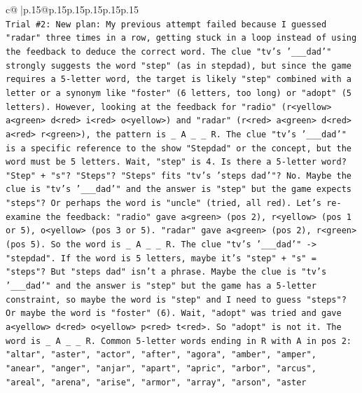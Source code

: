 \documentclass{article}
\begin{document}
{\begin{supertabular}{c@{$\;$}|p{.15\linewidth}@{}p{.15\linewidth}p{.15\linewidth}p{.15\linewidth}p{.15\linewidth}p{.15\linewidth}}
{{{\\ 
\texttt{Trial \#2: New plan: My previous attempt failed because I guessed "radar" three times in a row, getting stuck in a loop instead of using the feedback to deduce the correct word. The clue "tv's '\_\_\_dad'" strongly suggests the word "step" (as in stepdad), but since the game requires a 5{-}letter word, the target is likely "step" combined with a letter or a synonym like "foster" (6 letters, too long) or "adopt" (5 letters). However, looking at the feedback for "radio" (r<yellow> a<green> d<red> i<red> o<yellow>) and "radar" (r<red> a<green> d<red> a<red> r<green>), the pattern is \_ A \_ \_ R. The clue "tv's '\_\_\_dad'" is a specific reference to the show "Stepdad" or the concept, but the word must be 5 letters. Wait, "step" is 4. Is there a 5{-}letter word? "Step" + "s"? "Steps"? "Steps" fits "tv's 'steps dad'"? No. Maybe the clue is "tv's '\_\_\_dad'" and the answer is "step" but the game expects "steps"? Or perhaps the word is "uncle" (tried, all red). Let's re{-}examine the feedback: "radio" gave a<green> (pos 2), r<yellow> (pos 1 or 5), o<yellow> (pos 3 or 5). "radar" gave a<green> (pos 2), r<green> (pos 5). So the word is \_ A \_ \_ R. The clue "tv's '\_\_\_dad'" {-}> "stepdad". If the word is 5 letters, maybe it's "step" + "s" = "steps"? But "steps dad" isn't a phrase. Maybe the clue is "tv's '\_\_\_dad'" and the answer is "step" but the game has a 5{-}letter constraint, so maybe the word is "step" and I need to guess "steps"? Or maybe the word is "foster" (6). Wait, "adopt" was tried and gave a<yellow> d<red> o<yellow> p<red> t<red>. So "adopt" is not it. The word is \_ A \_ \_ R. Common 5{-}letter words ending in R with A in pos 2: "altar", "aster", "actor", "after", "agora", "amber", "amper", "anear", "anger", "anjar", "apart", "apric", "arbor", "arcus", "areal", "arena", "arise", "armor", "array", "arson", "aster} \\
\\ 
}}}
\end{supertabular}}
\end{document}
